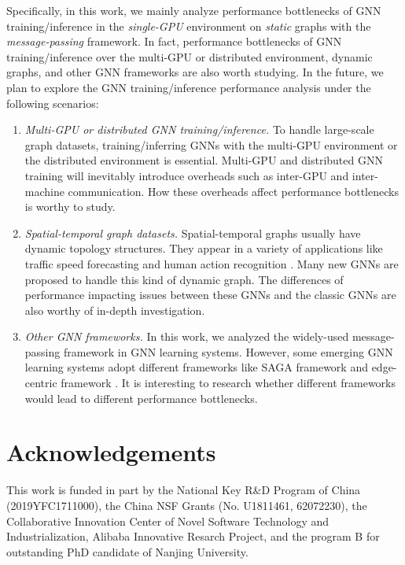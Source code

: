 Specifically, in this work, we mainly analyze performance bottlenecks of GNN training/inference in the \emph{single-GPU} environment on \emph{static} graphs with the \emph{message-passing} framework.
%
In fact, performance bottlenecks of GNN training/inference over the multi-GPU or distributed environment, dynamic graphs, and other GNN frameworks are also worth studying.
%
In the future, we plan to explore the GNN training/inference performance analysis under the following scenarios:
%
\begin{enumerate}
    \item \emph{Multi-GPU or distributed GNN training/inference.}
    To handle large-scale graph datasets, training/inferring GNNs with the multi-GPU environment or the distributed environment is essential.
    Multi-GPU and distributed GNN training will inevitably introduce overheads such as inter-GPU and inter-machine communication. 
    How these overheads affect performance bottlenecks is worthy to study.
    \item \emph{Spatial-temporal graph datasets.}
    Spatial-temporal graphs usually have dynamic topology structures.
    They appear in a variety of applications like traffic speed forecasting \cite{li2018_DCRNN} and human action recognition \cite{yan2018_STGCN}.
    Many new GNNs are proposed to handle this kind of dynamic graph.
    The differences of performance impacting issues between these GNNs and the classic GNNs are also worthy of in-depth investigation.
    \item \emph{Other GNN frameworks.}
    In this work, we analyzed the widely-used message-passing framework in GNN learning systems.
    However, some emerging GNN learning systems adopt different frameworks like SAGA framework \cite{ma2019_neugraph} and edge-centric framework \cite{he2019_EnGN}.
    It is interesting to research whether different frameworks would lead to different performance bottlenecks.
\end{enumerate}

\section*{Acknowledgements}

This work is funded in part by the National Key R\&D Program of China (2019YFC1711000), the China NSF Grants (No. U1811461, 62072230), the Collaborative Innovation Center of Novel Software Technology and Industrialization, Alibaba Innovative Resarch Project, and the program B for outstanding PhD candidate of Nanjing University.

